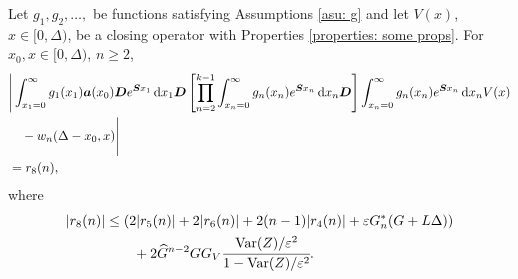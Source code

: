 \begin{cor}\label{cor: ahjg}
	Let \(g_1,g_2,\dots,\) be functions satisfying Assumptions \ref{asu: g} and let \(V(x)\), \(x\in[0,\Delta)\), be a closing operator with Properties \ref{properties: some props}. For \(x_0,x\in\mathcal [0,\Delta)\), \(n\geq 2\), 
	\begin{align}
		&\Bigg| \int_{x_1=0}^\infty g_1(x_1) \boldsymbol a (x_0) \boldsymbol D e^{\boldsymbol{S}x_1}\, \mathrm{d} x_1\boldsymbol D 
            	\left[\prod_{n=2}^{k-1}\int_{x_n=0}^\infty g_n(x_n) e^{\boldsymbol{S}x_n} \, \mathrm{d} x_n
		\boldsymbol D\right]
            	\int_{x_n=0}^\infty g_{n}(x_n) e^{\boldsymbol{S}x_n} \, \mathrm{d} x_n V(x) \nonumber 
		\\&\quad{}- w_n(\Delta - x_0,x) \Bigg| \nonumber
		\\&= r_8(n),
	\end{align}
	where 
	\begin{align*}
	|r_8(n)|&\leq  \left( 2|r_5(n)| + 2|r_6(n)| + 2(n-1)|r_4(n)| + \varepsilon G_n^{*}(G+L\Delta) \right) \\&\qquad{}+ 2\widehat G^{n-2}GG_V\cfrac{\mathrm{Var}(Z)/\varepsilon^2}{1-\mathrm{Var}(Z)/\varepsilon^2}.\end{align*}
\end{cor}
